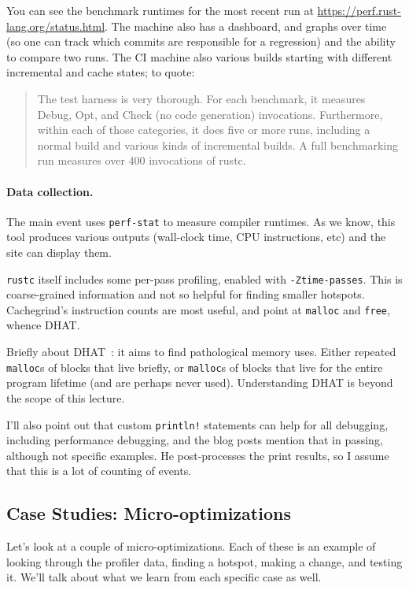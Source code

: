 \documentclass[a4paper]{report}
\begin{document}
You can see the benchmark runtimes for the most recent run at \url{https://perf.rust-lang.org/status.html}.
The machine also has a dashboard, and graphs over time (so one can track which commits are responsible for a regression) and the
ability to compare two runs. The CI machine also various builds starting with different incremental and cache states; to quote:
\begin{quote}
The test harness is very thorough. For each benchmark, it measures Debug, Opt, and Check (no code generation) invocations. Furthermore, within each of those categories, it does five or more runs, including a normal build and various kinds of incremental builds. A full benchmarking run measures over 400 invocations of rustc.
\end{quote}

\paragraph{Data collection.} The main event uses \texttt{perf-stat} to measure compiler runtimes.
As we know, this tool produces various outputs (wall-clock time, CPU
instructions, etc) and the site can display them.


\texttt{rustc} itself includes some per-pass profiling, enabled with \texttt{-Ztime-passes}. This is
coarse-grained information and not so helpful for finding smaller hotspots. Cachegrind's instruction
counts are most useful, and point at \texttt{malloc} and \texttt{free}, whence DHAT.

Briefly about DHAT~\cite{seward10:_fun_dhat}: it aims to find
pathological memory uses.  Either repeated \texttt{malloc}s of blocks
that live briefly, or \texttt{malloc}s of blocks that live for the
entire program lifetime (and are perhaps never used). Understanding
DHAT is beyond the scope of this lecture.

I'll also point out that custom \texttt{println!} statements can help for all debugging, including
performance debugging, and the blog posts mention that in passing, although not specific examples.
He post-processes the print results, so I assume that this is a lot of counting of events.

\subsection*{Case Studies: Micro-optimizations}
Let's look at a couple of micro-optimizations. Each of these is an example of looking through
the profiler data, finding a hotspot, making a change, and testing it. We'll talk
about what we learn from each specific case as well.
\end{document}
